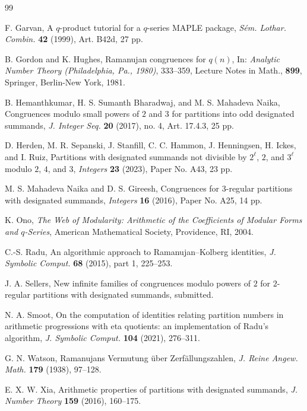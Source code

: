 \documentclass[12pt,reqno]{amsart}
\numberwithin{equation}{section}
\theoremstyle{theorem}
\theoremstyle{definition}
\begin{document}
\begin{thebibliography}{99}

F. Garvan, 
A $q$-product tutorial for a $q$-series MAPLE package, 
\textit{S\'em. Lothar. Combin.} \textbf{42} (1999), Art. B42d, 27 pp.

B. Gordon and K. Hughes, 
Ramanujan congruences for $q(n)$, 
In: \textit{Analytic Number Theory (Philadelphia, Pa., 1980)}, 333--359, Lecture Notes in Math., \textbf{899}, Springer, Berlin-New York, 1981.

B. Hemanthkumar, H. S. Sumanth Bharadwaj, and M. S. Mahadeva Naika, Congruences modulo small powers of $2$ and $3$ for partitions into odd designated summands, \textit{J. Integer Seq.} \textbf{20} (2017), no. 4, Art. 17.4.3, 25 pp.

D. Herden, M. R. Sepanski, J. Stanfill, C. C. Hammon, J. Henningsen, H. Ickes, and I. Ruiz, Partitions with designated summands not divisible by $2^\ell$, $2$, and $3^\ell$ modulo $2$, $4$, and $3$, \textit{Integers} \textbf{23} (2023), Paper No. A43, 23 pp.


M. S. Mahadeva Naika and D. S. Gireesh, Congruences for $3$-regular partitions with designated summands, \textit{Integers} \textbf{16} (2016), Paper No. A25, 14 pp.

K. Ono, 
\textit{The Web of Modularity: Arithmetic of the Coefficients of Modular Forms and $q$-Series}, 
American Mathematical Society, Providence, RI, 2004.

C.-S. Radu, 
An algorithmic approach to Ramanujan--Kolberg identities, 
\textit{J. Symbolic Comput.} \textbf{68} (2015), part 1, 225--253.


J. A. Sellers, New infinite families of congruences modulo powers of $2$ for $2$-regular partitions with designated summands, submitted.  

N. A. Smoot, 
On the computation of identities relating partition numbers in arithmetic progressions with eta quotients: an implementation of Radu's algorithm, 
\textit{J. Symbolic Comput.} \textbf{104} (2021), 276--311.

G. N. Watson, 
Ramanujans Vermutung \"uber Zerf\"allungszahlen, 
\textit{J. Reine Angew. Math.} \textbf{179} (1938), 97--128.

E. X. W. Xia, Arithmetic properties of partitions with designated summands, \textit{J. Number Theory} \textbf{159} (2016), 160--175.

\end{thebibliography}
\end{document}
